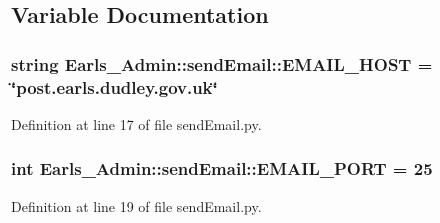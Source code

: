 \subsection{Variable Documentation}
\hypertarget{namespaceEarls__Admin_1_1sendEmail_c59c372a8f135fa45f5e215a181d538e}{
\subsubsection[EMAIL\_\-HOST]{\setlength{\rightskip}{0pt plus 5cm}string {\bf Earls\_\-Admin::sendEmail::EMAIL\_\-HOST} = \char`\"{}post.earls.dudley.gov.uk\char`\"{}}}
\label{namespaceEarls__Admin_1_1sendEmail_c59c372a8f135fa45f5e215a181d538e}




Definition at line 17 of file sendEmail.py.\hypertarget{namespaceEarls__Admin_1_1sendEmail_8f6a9a2cc878074795d5d7146a56a4d1}{
\subsubsection[EMAIL\_\-PORT]{\setlength{\rightskip}{0pt plus 5cm}int {\bf Earls\_\-Admin::sendEmail::EMAIL\_\-PORT} = 25}}
\label{namespaceEarls__Admin_1_1sendEmail_8f6a9a2cc878074795d5d7146a56a4d1}




Definition at line 19 of file sendEmail.py.